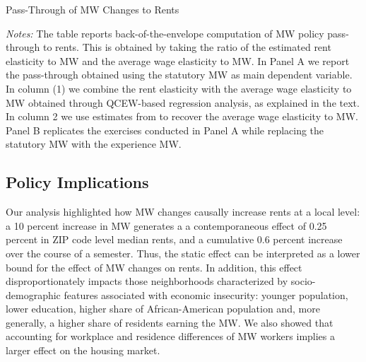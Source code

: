 \begin{table}[!h] 
	\centering
	\caption{Pass-Through of MW Changes to Rents}
	\label{tab:passthrough}  
	
	\begin{minipage}{0.95\textwidth} \footnotesize
		\vspace{2mm}
		\textit{Notes:} The table reports back-of-the-envelope computation of MW 
		policy pass-through to rents. This is obtained by taking the ratio of the 
		estimated rent elasticity to MW and the average wage elasticity to MW. 
		In Panel A we report the pass-through obtained using the statutory MW as 
		main dependent variable. In column (1) we combine the rent elasticity with 
		the average wage elasticity to MW obtained through QCEW-based regression
		analysis, as explained in the text. In column 2 we use estimates
		from \textcite{CegnizEtAl2019} to recover the average wage elasticity to MW. 
		Panel B replicates the exercises conducted in Panel A while replacing the 
		statutory MW with the experience MW. 
	\end{minipage}
\end{table}

\subsection{Policy Implications}\label{sec:policy}

Our analysis highlighted how MW changes causally increase rents at a local level: a 10 
percent increase in MW generates a a contemporaneous effect of 0.25 percent in ZIP code 
level median rents, and a cumulative 0.6 percent increase over the course of a semester. 
Thus, the static effect can be interpreted as a lower bound for the effect of MW changes on rents. 
In addition, this effect disproportionately impacts those neighborhoods characterized by 
socio-demographic features associated with economic insecurity: younger population, lower 
education, higher share of African-American population and, more generally, a higher share 
of residents earning the MW. We also showed that accounting for workplace and 
residence differences of MW workers implies a larger effect on the housing market.

